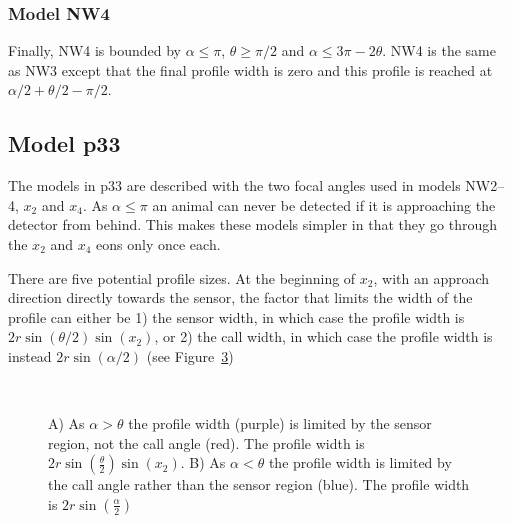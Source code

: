 

\subsubsection{Model NW4} \label{NW4}

Finally, NW4 is bounded by $\alpha\le \pi$, $\theta\ge \pi/2$ and $\alpha \le 3\pi - 2\theta$. NW4 is the same as NW3 except that the final profile width is zero and this profile is reached at $\alpha/2+\theta/2-\pi/2$. 



\subsection{Model p33} \label{p33}
 
The models in p33 are described with the two focal angles used in models NW2--4, $x_2$ and $x_4$. As $\alpha \le\pi$ an animal can never be detected if it is approaching the detector from behind. This makes these models simpler in that they go through the $x_2$ and $x_4$ eons only once each. 

There are five potential profile sizes. At the beginning of $x_2$, with an approach direction directly towards the sensor, the factor that limits the width of the profile can either be 1) the sensor width,  in which case the profile width is $2r\sin\left(\theta/2\right)\sin(x_2)$, or 2) the call width, in which case the profile width is instead $2r\sin(\alpha /2)$ (see Figure~\ref{f:p33})

\begin{figure}[t]
        \centering
        \begin{subfigure}[t]{0.4\textwidth}
                \centering
                \caption{}
                \label{f:p33x2a}
        \end{subfigure}
	~
	\begin{subfigure}[t]{0.4\textwidth}
                \centering
                \caption{}
                \label{f:p33x2t}
        \end{subfigure}

\caption{A) As $\alpha > \theta$ the profile width (purple) is limited by the sensor region, not the call angle (red). The profile width is $2r\sin\left(\frac{\theta}{2}\right)\sin(x_2)$. B) As $\alpha < \theta$ the profile width is limited by the call angle rather than the sensor region (blue). The profile width is $2r\sin\left(\frac{\alpha}{2}\right)$   }
\label{f:p33}
\end{figure}

